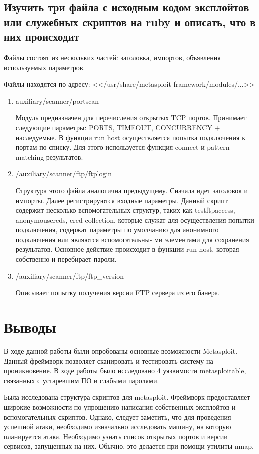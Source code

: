 \documentclass[utf8x, 12pt]{G7-32}
\begin{document}
\newpage
\section{Изучить три файла с исходным кодом эксплойтов или служебных скриптов на ruby и описать, что в них происходит}

Файлы состоят из нескольких частей: заголовка, импортов, объявления используемых параметров. 

Файлы находятся по адресу: <</usr/share/metasploit-framework/modules/...>>

\begin{enumerate}

	\item auxiliary/scanner/portscan

Модуль предназначен для перечисления открытых TCP портов. Принимает следующие параметры: PORTS, TIMEOUT, CONCURRENCY + наследуемые.
В функции run host осуществляется попытка подключения к портам по списку. Для этого используется функция connect и pattern matching результатов.
\medskip

	\item /auxiliary/scanner/ftp/ftplogin
	
Структура этого файла аналогична предыдущему. Сначала идет заголовок и импорты. Далее регистрируются входные параметры. Данный скрипт содержит несколько вспомогательных структур, таких как testftpaccess, anonymouscreds, cred collection, которые служат для осуществления попытки подключения, содержат параметры по умолчанию для анонимного подключения или являются вспомогательны- ми элементами для сохранения результатов. Основное действие происходит в функции run host, которая собственно и перебирает пароли.
\medskip

	\item /auxiliary/scanner/ftp/ftp\_version
	
Описывает попытку получения версии FTP сервера из его банера.
\end{enumerate}


\chapter{Выводы}


В ходе данной работы были опробованы основные возможности Metasploit. Данный фреймворк позволяет сканировать и тестировать систему на проникновение. В ходе работы было исследовано 4 уязвимости metasploitable, связанных с устаревшим ПО и слабыми паролями. 

Была исследована структура скриптов для metasploit. Фреймворк предоставляет широкие возможности по упрощению написания собственных эксплойтов и вспомогательных скриптов. Однако, следует заметить, что для проведения успешной атаки, необходимо изначально исследовать машину, на которую планируется атака. Необходимо узнать список открытых портов и версии сервисов, запущенных на них. Обычно, это делается при помощи утилиты nmap.
\end{document}
